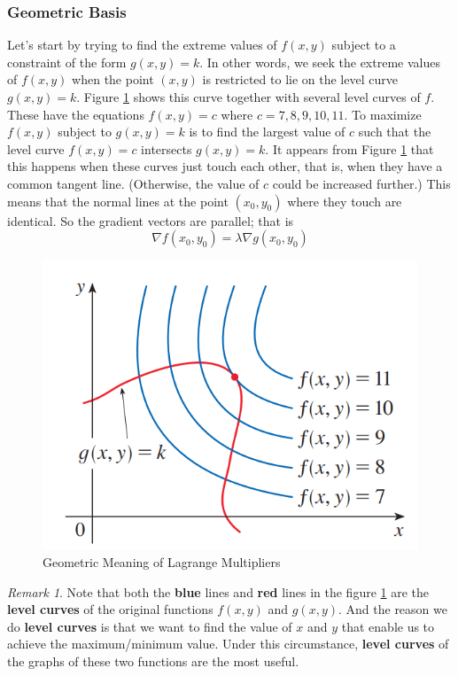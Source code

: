 \documentclass[math,code]{amznotes}
\theoremstyle{remark}
\newtheorem*{remark}{Remark}
\begin{document}
\subsubsection{Geometric Basis}
Let's start by trying to find the extreme values of $f(x,y)$ subject to a constraint of the form $g(x,y)=k$. In other words, we seek the extreme values of $f(x,y)$ when the point $(x,y)$ is restricted to lie on the level curve $g(x,y)=k$. Figure \ref{fig:geometric-meaning-lagrange-multiplier} shows this curve together with several level curves of $f$. These have the equations $f(x,y)=c$ where $c=7,8,9,10,11$. To maximize $f(x,y)$ subject to $g(x,y)=k$ is to find the largest value of $c$ such that the level curve $f(x,y)=c$ intersects $g(x,y)=k$. It appears from Figure \ref{fig:geometric-meaning-lagrange-multiplier} that this happens when these curves just touch each other, that is, when they have a common tangent line. (Otherwise, the value of $c$ could be increased further.) This means that the normal lines at the point $(x_0,y_0)$ where they touch are identical. So the gradient vectors are parallel; that is
\begin{displaymath}
    \nabla f(x_0,y_0)=\lambda \nabla g(x_0,y_0)
\end{displaymath}
\begin{figure}[H]
    \centering
    \includegraphics[width=0.5\linewidth]{images/geometric-meaning-lagrange-multiplier.png}
    \caption{Geometric Meaning of Lagrange Multipliers}
    \label{fig:geometric-meaning-lagrange-multiplier}
\end{figure}
\begin{notebox}
    \begin{remark}
        Note that both the {\color{blue} \textbf{blue}} lines and {\color{red} \textbf{red}} lines in the figure \ref{fig:geometric-meaning-lagrange-multiplier} are the {\color{red} \textbf{level curves}} of the original functions $f(x,y)$ and $g(x,y)$. And the reason we do {\color{red} \textbf{level curves}} is that we want to find the value of $x$ and $y$ that enable us to achieve the maximum/minimum value. Under this circumstance, {\color{red} \textbf{level curves}} of the graphs of these two functions are the most useful.
    \end{remark}
\end{notebox}
\end{document}
